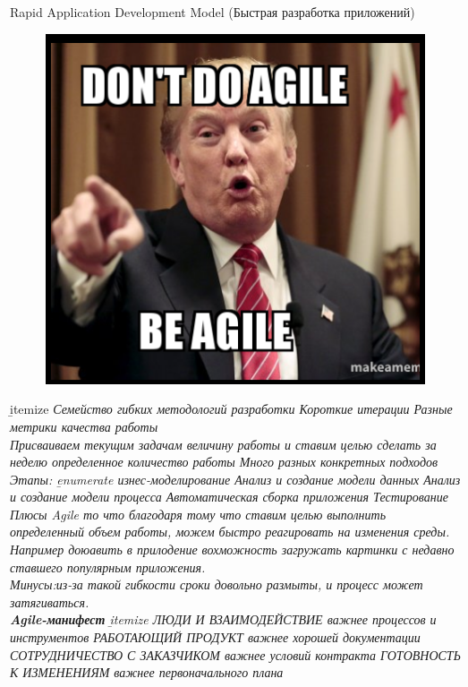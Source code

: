 \documentclass[12pt; a4paper]{book}
\theoremstyle{plain} %
\theoremstyle{defenition}
\theoremstyle{remark}
\begin{document}
\newpage
{}
Rapid Application Development Model (Быстрая разработка приложений)
\begin{figure}[!htbp]
\includegraphics[angle=0, width=\textwidth]{IMG/17} \\

\end{figure}
\b{itemize}
    \it Семейство гибких методологий разработки
    \it Короткие итерации
    \it Разные метрики качества работы \\
    {\ns Присваиваем текущим задачам величину работы и ставим целью сделать за неделю определенное количество работы}
    \it Много разных конкретных подходов
    \it Этапы:
        \b{enumerate}
        \it изнес-моделирование
        \it Анализ и создание модели данных
        \it Анализ и создание модели процесса
        \it Автоматическая сборка приложения
        \it Тестирование
Плюсы Agile то что благодаря тому что ставим целью выполнить определенный объем работы, можем быстро реагировать на изменения среды. Например доюавить в прилодение вохможность загружать картинки с недавно ставшего популярным приложения.\\
 Минусы:из-за такой гибкости сроки довольно размыты, и процесс может затягиваться.\\

\textbf{Agile-манифест}
\b{itemize}
    \it ЛЮДИ И ВЗАИМОДЕЙСТВИЕ важнее процессов и инструментов
    \it РАБОТАЮЩИЙ ПРОДУКТ важнее хорошей документации
    \it СОТРУДНИЧЕСТВО С ЗАКАЗЧИКОМ важнее условий контракта
    \it ГОТОВНОСТЬ К ИЗМЕНЕНИЯМ важнее первоначального плана
\end{document}
